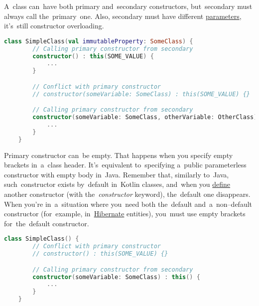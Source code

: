\noindent A~class can~have both primary and~secondary constructors, but~secondary must always call the~primary~one.
Also, secondary must have different \hyperref[parameterargument]{parameters}, it's~still constructor overloading.

\begin{lstlisting}[language=Kotlin]
    class SimpleClass(val immutableProperty: SomeClass) {
        // Calling primary constructor from secondary
        constructor() : this(SOME_VALUE) {
            ...
        }

        // Conflict with primary constructor
        // constructor(someVariable: SomeClass) : this(SOME_VALUE) {}

        // Calling primary constructor from secondary
        constructor(someVariable: SomeClass, otherVariable: OtherClass) : this(SOME_VALUE) {
            ...
        }
    }
\end{lstlisting}
\newline

\noindent Primary constructor can~be empty.
That happens when you specify empty brackets in~a~class header.
It's~equivalent to~specifying a~public parameterless constructor with empty body in~Java.
Remember that, similarly to~Java, such~constructor exists by~default in~Kotlin classes, and~when you \hyperref[declarationdefinition]{define} another constructor (with the~\textit{constructor} keyword), the~default one disappears.
When you're in~a~situation where you~need both the~default and~a~non--default constructor (for~example, in~\hyperref[hibernate]{Hibernate} entities), you~must use empty brackets for~the~default constructor.

\begin{lstlisting}[language=Kotlin]
    class SimpleClass() {
        // Conflict with primary constructor
        // constructor() : this(SOME_VALUE) {}

        // Calling primary constructor from secondary
        constructor(someVariable: SomeClass) : this() {
            ...
        }
    }
\end{lstlisting}
